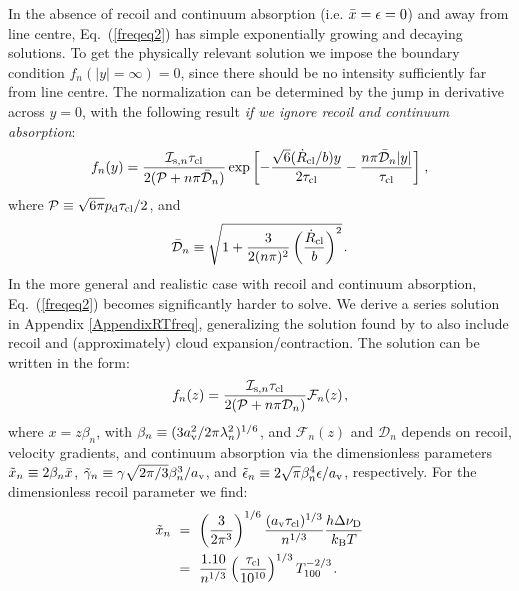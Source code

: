 \documentclass[fleqn,usenatbib]{mnras}
\newcommand{\taucl}{\tau_{\rm cl}}
\begin{document}
In the absence of recoil and continuum absorption (i.e. $\Bar{x} = \epsilon = 0$) and away from line centre, Eq.~(\ref{freqeq2}) has simple exponentially growing and decaying solutions. To get the physically relevant solution we impose the boundary condition $f_n(\lvert y \rvert = \infty) = 0$, since there should be no intensity sufficiently far from line centre. The normalization can be determined by the jump in derivative across $y = 0$, with the following result \textit{if we ignore recoil and continuum absorption}:
\begin{equation}
     f_n(y) = \dfrac{\mathcal{I}_{\textrm{s}, n} \tau_{\rm cl}}{2(\mathcal{P} + n \pi \Bar{\mathcal{D}}_n)} \exp\left[  - \dfrac{\sqrt{6} (\Dot{R}_{\rm cl}/b) y}{2\taucl} - \dfrac{n \pi \Bar{\mathcal{D}}_n \lvert y \rvert}{\tau_{\rm cl}} \right] \hspace{1 pt} \label{Solution f_n no recoil or dust},
\end{equation}
where $\mathcal{P} \equiv \sqrt{6 \pi} p_{\rm d} \tau_{\rm cl}/2$, and
\begin{equation}
    \Bar{\mathcal{D}}_n \equiv  \sqrt{1 +   \dfrac{3}{2 (n \pi)^2} \left( \dfrac{\Dot{R}_{\rm cl}}{b} \right)^2 } \hspace{1 pt} \label{Overbar D_n definition}.
\end{equation}
In the more general and realistic case with recoil and continuum absorption, Eq.~(\ref{freqeq2}) becomes significantly harder to solve. We derive a series solution in Appendix \ref{AppendixRTfreq}, generalizing the solution found by \cite{Neufeld1990} to also include recoil and (approximately) cloud expansion/contraction. The solution can be written in the form:
\begin{equation}
    f_n(z) = \dfrac{\mathcal{I}_{\textrm{s}, n} \tau_{\rm cl}}{2(\mathcal{P} + n \pi\mathcal{D}_n)} \mathcal{F}_n(z) \hspace{1 pt} \label{f_n expression general},
\end{equation}
where $x = z \beta_n$, with $\beta_n \equiv (3 a_{\rm v}^2/ 2\pi \lambda_n^2)^{1/6}$, and $\mathcal{F}_n(z)$ and $\mathcal{D}_n$ depends on recoil, velocity gradients, and continuum absorption via the dimensionless parameters $\Tilde{x}_n \equiv 2 \beta_n \Bar{x}$, $\Tilde{\gamma}_n \equiv \gamma \sqrt{2\pi/ 3} \beta_n^3 /a_{\rm v}$, and $\Tilde{\epsilon}_n \equiv 2 \sqrt{\pi} \beta_n^4 \epsilon/a_{\rm v}$, respectively. For the dimensionless recoil parameter we find:
\begin{align}
    \Tilde{x}_n ~&=~ \left( \dfrac{3}{2 \pi^3} \right)^{1/6} \dfrac{(a_{\rm v} \taucl)^{1/3}}{n^{1/3}} \dfrac{h \Delta\nu_{\rm D}}{k_{\rm B} T} \nonumber \\ ~&=~ \dfrac{1.10}{n^{1/3}} \left(\dfrac{\taucl}{10^{10}}\right)^{1/3} T_{100}^{-2/3} \hspace{1 pt} \label{xtilde expression}.
\end{align}
\end{document}
